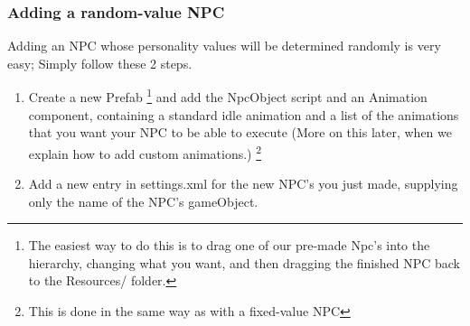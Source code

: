 \documentclass[11pt]{article} %
\begin{document}
\begin{figure}[h]
\end{figure}

\newpage
\subsubsection{Adding a random-value NPC}
Adding an NPC whose personality values will be determined randomly is very easy; Simply follow these 2 steps.

\begin{enumerate}
\item Create a new Prefab \footnote{The easiest way to do this is to drag one of our pre-made Npc's into the hierarchy, changing what you want, and then dragging the finished NPC back to the Resources/ folder.} and add the NpcObject script and an Animation component, containing a standard idle animation and a list of the animations that you want your NPC to be able to execute (More on this later, when we explain how to add custom animations.) \footnote{This is done in the same way as with a fixed-value NPC} 
\item Add a new entry in settings.xml for the new NPC's you just made, supplying only the name of the NPC's gameObject.
\end{enumerate}
\end{document}
